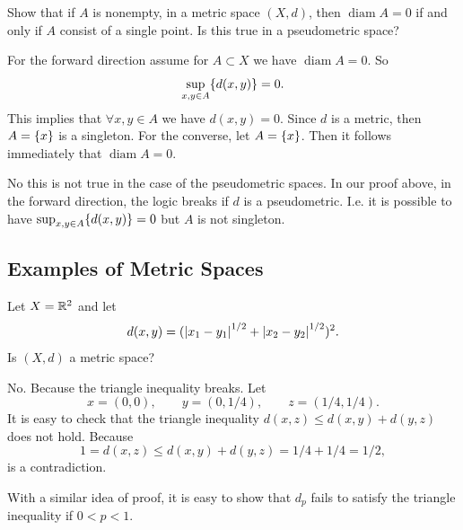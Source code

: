 \begin{problem}
	Show that if $ A $ is nonempty, in a metric space $ (X,d) $, then $ \operatorname{diam}A = 0 $ if and only if $ A $ consist of a single point. Is this true in a pseudometric space?
\end{problem}
\begin{solution}
	For the forward direction assume for $ A\subset X $ we have $ \operatorname{diam}A = 0 $. So
	\[ \sup_{x,y \in A} \{d(x,y)\} = 0. \]
	This implies that $ \forall x,y \in A $ we have $ d(x,y) = 0 $. Since $ d $ is a metric, then $ A = \{x\} $ is a singleton. For the converse, let $ A = \{x\} $. Then it follows immediately that $ \operatorname{diam} A  = 0 $.
	
	No this is not true in the case of the pseudometric spaces. In our proof above, in the forward direction, the logic breaks if $ d $ is a pseudometric. I.e. it is possible to have $ \sup_{x,y\in A}\{d(x,y)\} = 0 $ but $ A $ is not singleton.
\end{solution}


\subsection{Examples of Metric Spaces}

\begin{problem}
	Let $ X=\mathbb{R}^2 $ and let 
	\[ d(x,y) = (\left|x_1-y_1\right|^{1/2} + \left|x_2-y_2\right|^{1/2})^2. \]
	Is $ (X,d) $ a metric space?
\end{problem}
\begin{solution}
	No. Because the triangle inequality breaks. Let 
	\[ x = (0,0), \qquad y = (0,1/4), \qquad z = (1/4,1/4). \]
	It is easy to check that the triangle inequality $ d(x,z) \leq d(x,y) + d(y,z) $ does not hold. Because
	\[ 1 = d(x,z) \leq d(x,y) + d(y,z) = 1/4 + 1/4 = 1/2, \]
	is a contradiction.
	\begin{remark}
		With a similar idea of proof, it is easy to show that $ d_p $ fails to satisfy the triangle inequality if $ 0<p<1 $.
	\end{remark}
\end{solution}

